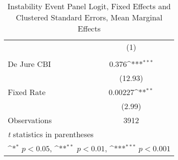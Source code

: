 \begin{table}[htbp]\centering
\def\sym#1{\ifmmode^{#1}\else\(^{#1}\)\fi}
\caption{Instability Event Panel Logit, Fixed Effects and Clustered Standard Errors, Mean Marginal Effects \label{margsJustBinInstabEventDJ}}
\begin{tabular}{l*{1}{c}}
\toprule
                                        &\multicolumn{1}{c}{(1)}\\
                                        &\multicolumn{1}{c}{}\\
\midrule
De Jure CBI                             &    0.376\sym{***}\\
                                        &  (12.93)         \\
\addlinespace
Fixed Rate                              &  0.00227\sym{**} \\
                                        &   (2.99)         \\
\midrule
Observations                            &     3912         \\
\bottomrule
\multicolumn{2}{l}{\footnotesize \textit{t} statistics in parentheses}\\
\multicolumn{2}{l}{\footnotesize \sym{*} \(p<0.05\), \sym{**} \(p<0.01\), \sym{***} \(p<0.001\)}\\
\end{tabular}
\end{table}
